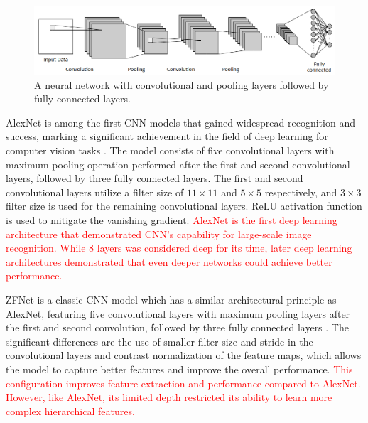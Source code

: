 \documentclass[preprint,12pt]{elsarticle}
\begin{document}
\begin{figure}[h!]
    \centering
    \includegraphics[scale=0.75]{fig_deep_sv_learning_cnn.png}
    \caption{A neural network with convolutional and pooling layers followed by fully connected layers.}
    \label{fig_deep_sv_learning_cnn}
\end{figure}

AlexNet is among the first CNN models that gained widespread recognition and success, marking a significant achievement in the field of deep learning for computer vision tasks \citep{krizhevsky_imagenet_2012}. The model consists of five convolutional layers with maximum pooling operation performed after the first and second convolutional layers, followed by three fully connected layers. The first and second convolutional layers utilize a filter size of $11 \times 11$ and $5 \times 5$ respectively, and $3 \times 3$ filter size is used for the remaining convolutional layers. ReLU activation function is used to mitigate the vanishing gradient. \textcolor{red}{AlexNet is the first deep learning architecture that demonstrated CNN's capability for large-scale image recognition. While 8 layers was considered deep for its time, later deep learning architectures demonstrated that even deeper networks could achieve better performance.}

ZFNet is a classic CNN model which has a similar architectural principle as AlexNet, featuring five convolutional layers with maximum pooling layers after the first and second convolution, followed by three fully connected layers \citep{zeiler_visualizing_2013}. The significant differences are the use of smaller filter size and stride in the convolutional layers and contrast normalization of the feature maps, which allows the model to capture better features and improve the overall performance. \textcolor{red}{This configuration improves feature extraction and performance compared to AlexNet. However, like AlexNet, its limited depth restricted its ability to learn more complex hierarchical features.}
\end{document}
